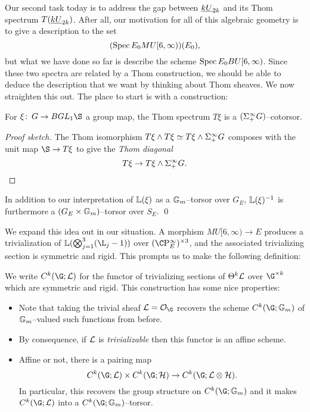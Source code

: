 Our second task today is to address the gap between $\underline{\smash{kU}}_{2k}$ and its Thom spectrum $T(\underline{\smash{kU}}_{2k})$.  After all, our motivation for all of this algebraic geometry is to give a description to the set \[(\operatorname{Spec} E_0 MU[6, \infty))(E_0),\] but what we have done so far is describe the scheme $\operatorname{Spec} E_0 BU[6, \infty)$.  Since these two spectra are related by a Thom construction, we should be able to deduce the description that we want by thinking about Thom sheaves.  We now straighten this out.  The place to start is with a construction:

\begin{lemma}
For $\xi\co G \to BGL_1 \S$ a group map, the Thom spectrum $T\xi$ is a $(\Sigma^\infty_+ G)$--cotorsor.
\end{lemma}
\begin{proof}[Proof sketch]
The Thom isomorphism $T\xi \wedge T\xi \simeq T\xi \wedge \Sigma^\infty_+ G$ composes with the unit map $\S \to T\xi$  to give the \textit{Thom diagonal} \[T\xi \to T\xi \wedge \Sigma^\infty_+ G. \qedhere\]
\end{proof}

\begin{corollary}
In addition to our interpretation of $\mathbb{L}(\xi)$ as a $\mathbb G_m$--torsor over $G_E$, $\mathbb{L}(\xi)^{-1}$ is furthermore a $(G_E \times \mathbb G_m)$--torsor over $S_E$. \qed
\end{corollary}

We expand this idea out in our situation.  A morphism $MU[6, \infty) \to E$ produces a trivialization of $\ThomSheaf{\bigotimes_{j=1}^3 (\L_j - 1)}$ over $(\CP^\infty_E)^{\times 3}$, and the associated trivializing section is symmetric and rigid.  This prompts us to make the following definition:

\begin{definition}
We write $C^k(\G; \sheaf L)$ for the functor of trivializing sections of $\Theta^k \mathcal{L}$ over $\G^{\times k}$ which are symmetric and rigid.  This construction has some nice properties:
\begin{itemize}
\item Note that taking the trivial sheaf $\sheaf L = \sheaf O_{\G}$ recovers the scheme $C^k(\G; \Gm)$ of $\mathbb G_m$--valued such functions from before.
\item By consequence, if $\mathcal{L}$ is \emph{trivializable} then this functor is an affine scheme.
\item Affine or not, there is a pairing map \[C^k(\G; \sheaf L) \times C^k(\G; \sheaf H) \to C^k(\G; \sheaf L \otimes \sheaf H).\]  In particular, this recovers the group structure on $C^k(\G; \Gm)$ and it makes $C^k(\G; \sheaf L)$ into a $C^k(\G; \Gm)$--torsor.
\end{itemize}
\end{definition}

